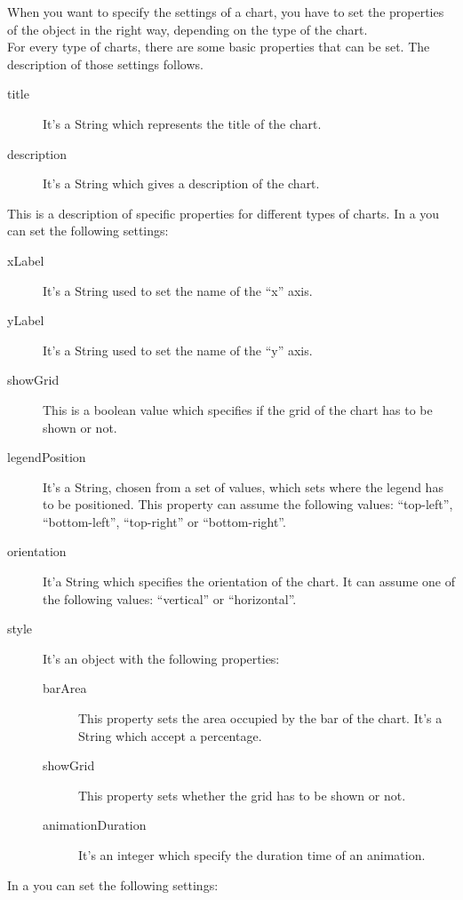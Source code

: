 			When you want to specify the settings of a chart, you have to set the properties of the  object in the right way, depending on the type of the chart.\\
			For every type of charts, there are some basic properties that can be set. The description of those settings follows.
			\begin{description}
				\item[title] It's a String which represents the title of the chart.
				\item[description] It's a String which gives a description of the chart.
			\end{description}
			This is a description of specific properties for different types of charts.
				In a  you can set the following settings:
				\begin{description}
					\item[xLabel] It's a String used to set the name of the “x” axis.
					\item[yLabel] It's a String used to set the name of the “y” axis.
					\item[showGrid] This is a boolean value which specifies if the grid of the chart has to be shown or not.
					\item[legendPosition] It's a String, chosen from a set of values, which sets where the legend has to be positioned. This property can assume the following values: “top-left”, “bottom-left”, “top-right” or “bottom-right”.
					\item[orientation] It'a String which specifies the orientation of the chart. It can assume one of the following values: “vertical” or “horizontal”.
					\item[style] It's an object with the following properties:
					\begin{description}
						\item[barArea] This property sets the area occupied by the bar of the chart. It's a String which accept a percentage.
						\item[showGrid] This property sets whether the grid has to be shown or not.
						\item[animationDuration] It's an integer which specify the duration time of an animation.
					\end{description}
				\end{description}
				In a  you can set the following settings:

